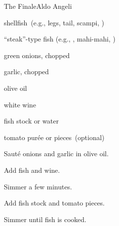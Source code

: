 \begin{recipe}{The Finale}{Aldo Angeli}{}

\begin{ingredients}
\item shellfish~(e.g.,  legs,  tail, scampi, )
\item ``steak''-type fish (e.g., , mahi-mahi, )
\item green onions, chopped
\item garlic, chopped
\item olive oil
\item \C{\half} white wine
\item \C{\half} fish stock or water
\item tomato purée or pieces~(optional)
\end{ingredients}

\begin{directions}
\item Sauté onions and garlic in olive oil.
\item Add fish and wine.
\item Simmer a few minutes.
\item Add fish stock and tomato pieces.
\item Simmer until fish is cooked.
\end{directions}

\end{recipe}
